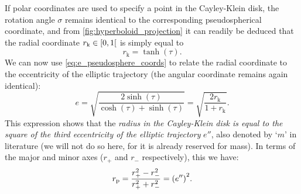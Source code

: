If polar coordinates are used to specify a point in the Cayley-Klein disk, the rotation angle \(\sigma\) remains identical to the corresponding pseudospherical coordinate, and from \cref{fig:hyperboloid_projection} it can readily be deduced that the radial coordinate \(r_\text{k} \in \interval[open right]{0}{1}\) is simply equal to
\begin{equation}
    r_\text{k} = \tanh(\tau).
\end{equation}
We can now use \cref{eq:e_pseudosphere_coords} to relate the radial coordinate to the eccentricity of the elliptic trajectory (the angular coordinate remains again identical):
\begin{equation}
    e = \sqrt{\frac{2\sinh(\tau)}{\cosh(\tau) + \sinh(\tau)}} = \sqrt{\frac{2r_\text{k}}{1 + r_\text{k}}}. 
\end{equation}
This expression shows that the \emph{radius in the Cayley-Klein disk is equal to the square of the third eccentricity of the elliptic trajectory} \(e''\), also denoted by `\(m\)' in literature (we will not do so here, for it is already reserved for mass). In terms of the major and minor axes (\(r_+\) and \(r_-\) respectively), this we have: \cite{Rapp1991}
\begin{equation}
    r_\text{p} = \frac{r_+^2 - r_-^2}{r_+^2 + r_-^2} = \qty(e'')^2.
    \label{eq:eccentricity_cayley}
\end{equation}

